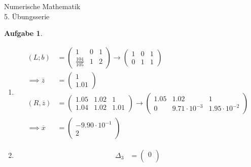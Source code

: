 \documentclass[11pt]{article}
\theoremstyle{break}
\newtheorem{task}{Aufgabe}
\newcommand{\hw}{5}
\begin{document}
\begin{center}
\Large{Numerische Mathematik}\\
\large{\hw. Übungsserie}
\end{center}
\begin{task}
    \hfill\vspace{-5mm}
    \begin{enumerate}[label={(\alph*)}]
        \item \hfill\vspace{-5mm}
        \begin{align*}
            (L;b) & = \left(\begin{array}{cc|c}
                1 & 0 & 1\\
                \frac{104}{105} & 1 & 2
            \end{array}\right)\rightarrow\left(\begin{array}{cc|c}
                1 & 0 & 1\\
                0 & 1 & 1
            \end{array}\right)\\
            \implies \overline{z} &= \begin{pmatrix}
                1\\
                1.01
            \end{pmatrix}\\
            (R,\overline{z}) &= \left(\begin{array}{cc|c}
                1.05 & 1.02 & 1\\
                1.04 & 1.02 & 1.01
            \end{array}\right)\rightarrow\left(\begin{array}{cc|c}
                1.05 & 1.02 & 1\\
                0 & 9.71\cdot 10^{-3} & 1.95\cdot 10^{-2}
            \end{array}\right)\\
            \implies \overline{x} &= \begin{pmatrix}
                -9.90\cdot 10^{-1}\\
                2
            \end{pmatrix}
        \end{align*}
        \item \begin{align*}
            \Delta_3 &= \begin{pmatrix}
                0\\

\end{pmatrix}
\end{align*}
\end{enumerate}
\end{task}
\end{document}
